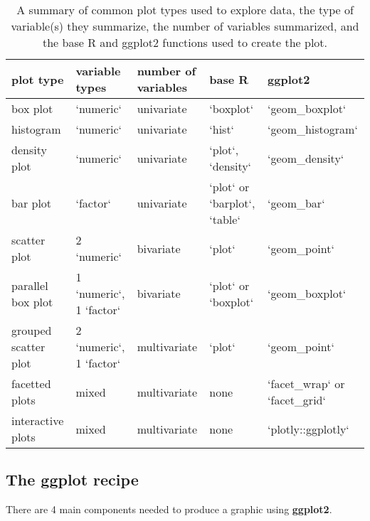 \documentclass[
]{book}
\theoremstyle{definition}
\theoremstyle{definition}
\theoremstyle{definition}
\theoremstyle{definition}
\theoremstyle{remark}
\begin{document}
\begin{table}

\caption{\label{tab:viz-sum}A summary of common plot types used to explore data, the type of variable(s) they summarize, the number of variables summarized, and the base R and ggplot2 functions used to create the plot.}
\centering
\begin{tabular}[t]{lllll}
\toprule
plot type & variable types & number of variables & base R & ggplot2\\
\midrule
box plot & `numeric` & univariate & `boxplot` & `geom\_boxplot`\\
histogram & `numeric` & univariate & `hist` & `geom\_histogram`\\
density plot & `numeric` & univariate & `plot`, `density` & `geom\_density`\\
bar plot & `factor` & univariate & `plot` or `barplot`, `table` & `geom\_bar`\\
scatter plot & 2 `numeric` & bivariate & `plot` & `geom\_point`\\
\addlinespace
parallel box plot & 1 `numeric`, 1 `factor` & bivariate & `plot` or `boxplot` & `geom\_boxplot`\\
grouped scatter plot & 2 `numeric`, 1 `factor` & multivariate & `plot` & `geom\_point`\\
facetted plots & mixed & multivariate & none & `facet\_wrap` or `facet\_grid`\\
interactive plots & mixed & multivariate & none & `plotly::ggplotly`\\
\bottomrule
\end{tabular}
\end{table}

\hypertarget{the-ggplot-recipe}{%
\subsection{The ggplot recipe}\label{the-ggplot-recipe}}

There are 4 main components needed to produce a graphic using \textbf{ggplot2}.
\end{document}
